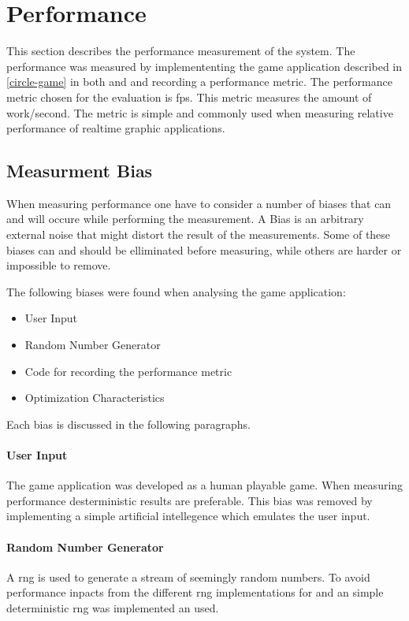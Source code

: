 \section{Performance}

This section describes the performance measurement of the system.
The performance was measured by implemententing the game application described in \autoref{circle-game} in both {\C} and {\rust} and recording a performance metric.
The performance metric chosen for the evaluation is \gls{fps}.
This metric measures the amount of work/second.
The metric is simple and commonly used when measuring relative performance of realtime graphic applications.

\subsection{Measurment Bias}
\label{sec:perf:bias}

When measuring performance one have to consider a number of biases that can and will occure while performing the measurement.
A Bias is an arbitrary external noise that might distort the result of the measurements.
Some of these biases can and should be elliminated before measuring, while others are harder or impossible to remove.

The following biases were found when analysing the game application:
\begin{itemize}
  \item User Input
  \item Random Number Generator
  \item Code for recording the performance metric
  \item Optimization Characteristics
\end{itemize}
Each bias is discussed in the following paragraphs.

\paragraph{User Input}
The game application was developed as a human playable game.
When measuring performance desterministic results are preferable.
This bias was removed by implementing a simple artificial intellegence which emulates the user input.

\paragraph{Random Number Generator}
A \gls{rng} is used to generate a stream of seemingly random numbers.
To avoid performance inpacts from the different \gls{rng} implementations for {\C} and {\rust} an simple deterministic \gls{rng} was implemented an used.

